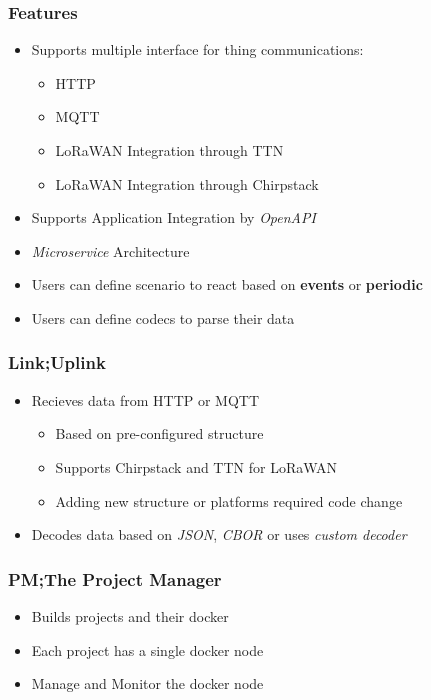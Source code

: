 \documentclass{../iot-lecture}
\begin{document}
\begin{frame}
  \frametitle{Features}
  \begin{itemize}
    \item Supports multiple interface for thing communications:
    \begin{itemize}
      \item HTTP
      \item MQTT
      \item LoRaWAN Integration through TTN
      \item LoRaWAN Integration through Chirpstack
    \end{itemize}
    \item Supports Application Integration by \textit{\color{LimeGreen} OpenAPI}
    \item \textit{\color{YellowOrange} Microservice} Architecture
    \item Users can define scenario to react based on \textbf{\color{Purple} events} or \textbf{\color{Cyan} periodic}
    \item Users can define codecs to parse their data
  \end{itemize}
\end{frame}

\begin{frame}
  \frametitle{Link;\@ Uplink}
  \begin{itemize}
    \item Recieves data from HTTP or MQTT
    \begin{itemize}
      \item Based on pre-configured structure
      \item Supports Chirpstack and TTN for LoRaWAN
      \item Adding new structure or platforms required code change
    \end{itemize}
    \item Decodes data based on \textit{\color{LimeGreen} JSON}, \textit{\color{Orange} CBOR} or uses \textit{\color{RubineRed} custom decoder}
  \end{itemize}
\end{frame}

\begin{frame}
  \frametitle{PM;\@ The Project Manager}
  \begin{itemize}
    \item Builds projects and their {\color{Cyan} docker}
    \item Each project has a single docker node
    \item Manage and Monitor the docker node
  \end{itemize}
\end{frame}
\end{document}
